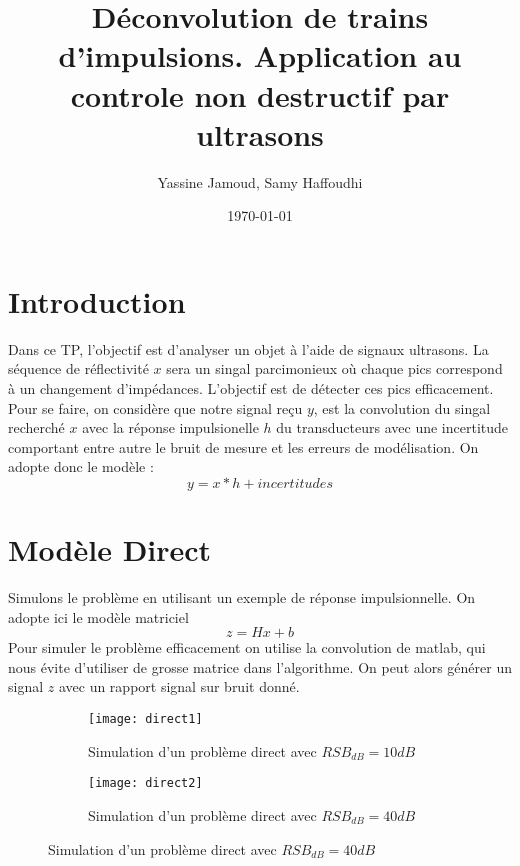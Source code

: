 \documentclass[12pt,a4paper,titlepage]{article}
\title{Déconvolution de trains d’impulsions. Application au controle non destructif par ultrasons}
\author{Yassine Jamoud, Samy Haffoudhi}
\date{\today}
\begin{document}
\maketitle

\section*{Introduction}
Dans ce TP, l'objectif est d'analyser un objet à l'aide de signaux ultrasons. La séquence de réflectivité $x$ sera un singal parcimonieux où chaque pics correspond à un changement d'impédances. L'objectif est de détecter ces pics efficacement. Pour se faire, on considère que notre signal reçu $y$, est la convolution du singal recherché $x$ avec la réponse impulsionelle $h$ du transducteurs avec une incertitude comportant entre autre le bruit de mesure et les erreurs de modélisation. On adopte donc le modèle :
$$
y=x\ast h + incertitudes
$$

\section{Modèle Direct}
Simulons le problème en utilisant un exemple de réponse impulsionnelle. On adopte ici le modèle matriciel
$$
z=Hx+b
$$
Pour simuler le problème efficacement on utilise la convolution de matlab, qui nous évite d'utiliser de grosse matrice dans l'algorithme. On peut alors générer un signal $z$ avec un rapport signal sur bruit donné.
	\begin{figure}[H]
     		\centering
    		\begin{subfigure}[H]{0.45\textwidth}
         		\centering
         		\texttt{[image: direct1]}
         		\caption{Simulation d'un problème direct avec $RSB_{dB}=10dB$}
    		\end{subfigure}
     		\hfill
    	 	\begin{subfigure}[H]{0.45\textwidth}
         		\centering
         		\texttt{[image: direct2]}
         		\caption{Simulation d'un problème direct avec $RSB_{dB}=40dB$}
     		\end{subfigure}
	\end{figure}
\end{document}
